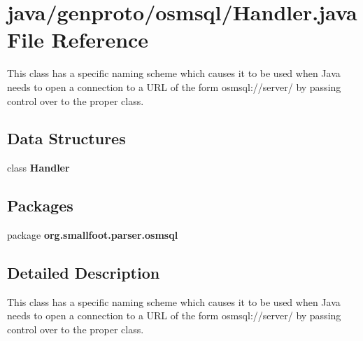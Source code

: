 \section{java/genproto/osmsql/\+Handler.java File Reference}
\label{osmsql_2Handler_8java}


This class has a specific naming scheme which causes it to be used when Java needs to open a connection to a U\+R\+L of the form osmsql\+://server/ by passing control over to the proper class.  


\subsection*{Data Structures}
\begin{DoxyCompactItemize}
\item 
class {\bf Handler}
\end{DoxyCompactItemize}
\subsection*{Packages}
\begin{DoxyCompactItemize}
\item 
package {\bf org.\+smallfoot.\+parser.\+osmsql}
\end{DoxyCompactItemize}


\subsection{Detailed Description}
This class has a specific naming scheme which causes it to be used when Java needs to open a connection to a U\+R\+L of the form osmsql\+://server/ by passing control over to the proper class. 

